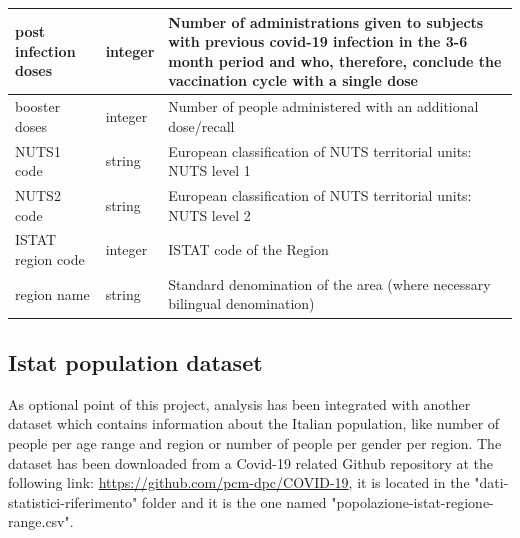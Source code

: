 \documentclass{article}
\begin{document}
\newpage
\begin{center}
\begin{tabular}{ |m{4cm}|m{2cm}|m{4.5cm}|}
\hline
  post infection doses & integer & Number of administrations given to subjects with previous covid-19 infection in the 3-6 month period and who, therefore, conclude the vaccination cycle with a single dose\\ 
    \hline
  booster doses & integer & Number of people administered with an additional dose/recall\\ 
    \hline
  NUTS1 code & string & European classification of NUTS territorial units: NUTS level 1\\ 
    \hline
  NUTS2 code & string & European classification of NUTS territorial units: NUTS level 2\\ 
    \hline
  ISTAT region code & integer & ISTAT code of the Region\\
    \hline
  region name & string & Standard denomination of the area (where necessary bilingual denomination)\\ 
  \hline
  \end{tabular}
\end{center}
\hfill\break
\hfill\break



\newpage
\subsection{Istat population dataset}
As optional point of this project, analysis has been integrated with another dataset which contains information about the Italian population, like number of people per age range and region or number of people per gender per region. The dataset has been downloaded from a Covid-19 related Github repository at the following link: \url{https://github.com/pcm-dpc/COVID-19}, it is located in the {\selectfont"dati-statistici-riferimento"} folder and it is the one named {\selectfont"popolazione-istat-regione-range.csv"}.
\end{document}
